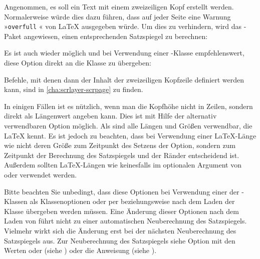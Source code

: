 \begin{Example}
  Angenommen, es soll ein Text mit einem zweizeiligen Kopf erstellt
  werden. Normalerweise würde dies dazu führen, dass auf jeder Seite
  eine Warnung »\texttt{overfull} « von {\LaTeX}
  ausgegeben würde. Um dies zu verhindern, wird das
  -Paket angewiesen, einen entsprechenden Satzspiegel
  zu berechnen:
  Es ist auch wieder möglich und bei Verwendung einer \KOMAScript-Klasse
  empfehlenswert, diese Option direkt an die Klasse zu übergeben:
  Befehle, mit denen dann der Inhalt der zweizeiligen Kopfzeile definiert
  werden kann, sind in \autoref{cha:scrlayer-scrpage} zu finden.
\end{Example}

In einigen Fällen ist es nützlich, wenn man die Kopfhöhe nicht in Zeilen,
sondern direkt als Längenwert angeben kann. Dies ist mit Hilfe der alternativ
verwendbaren Option 
möglich. Als  sind alle Längen und Größen verwendbar, die \LaTeX{}
kennt. Es ist jedoch zu beachten, dass bei Verwendung einer \LaTeX-Länge wie
 nicht deren Größe zum Zeitpunkt des Setzens der Option,
sondern zum Zeitpunkt der Berechnung des Satzspiegels und der Ränder
entscheidend ist. Außerdem sollten \LaTeX-Längen wie
 keinesfalls im optionalen Argument von
 oder
 verwendet werden.

Bitte beachten Sie unbedingt, dass diese Optionen bei
Verwendung einer der \KOMAScript-Klassen als Klassenoptionen oder per
 beziehungsweise
 nach dem Laden der Klasse übergeben werden
müssen. Eine Änderung dieser Optionen nach dem Laden von 
führt nicht zu einer automatischen
Neuberechnung des Satzspiegels. Vielmehr wirkt sich die Änderung erst bei der
nächsten Neuberechnung des Satzspiegels aus. Zur Neuberechnung des
Satzspiegels siehe Option
\hyperref[desc:\LabelBase.option.DIV.last]{} mit den Werten
\hyperref[desc:\LabelBase.option.DIV.last]{} oder
\hyperref[desc:\LabelBase.option.DIV.current]{} (siehe
) oder die Anweisung
 (siehe
).%
%
\EndIndexGroup


